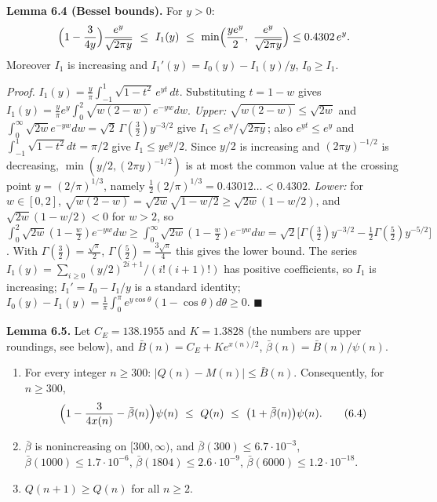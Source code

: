 \textbf{Lemma 6.4 (Bessel bounds).} For \(y>0\):
\[\Bigl(1-\frac3{4y}\Bigr)\frac{e^y}{\sqrt{2\pi y}}\ \le\ I_1(y)\ \le\ \min\Bigl(\frac{ye^y}2,\ \frac{e^y}{\sqrt{2\pi y}}\Bigr)\le0.4302\,e^y .\]
Moreover \(I_1\) is increasing and \(I_1'(y)=I_0(y)-I_1(y)/y\), \(I_0\ge I_1\).

\emph{Proof.} \(I_1(y)=\frac y\pi\int_{-1}^1\sqrt{1-t^2}\,e^{yt}\,dt\). Substituting \(t=1-w\) gives \(I_1(y)=\frac y\pi e^y\int_0^2\sqrt{w(2-w)}\,e^{-yw}dw\). \emph{Upper:} \(\sqrt{w(2-w)}\le\sqrt{2w}\) and \(\int_0^\infty\sqrt{2w}e^{-yw}dw=\sqrt2\,\Gamma(\frac32)y^{-3/2}\) give \(I_1\le e^y/\sqrt{2\pi y}\); also \(e^{yt}\le e^y\) and \(\int_{-1}^1\sqrt{1-t^2}dt=\pi/2\) give \(I_1\le ye^y/2\). Since \(y/2\) is increasing and \((2\pi y)^{-1/2}\) is decreasing, \(\min(y/2,(2\pi y)^{-1/2})\) is at most the common value at the crossing point \(y=(2/\pi)^{1/3}\), namely \(\frac12(2/\pi)^{1/3}=0.43012\ldots<0.4302\). \emph{Lower:} for \(w\in[0,2]\), \(\sqrt{w(2-w)}=\sqrt{2w}\sqrt{1-w/2}\ge\sqrt{2w}(1-w/2)\), and \(\sqrt{2w}(1-w/2)<0\) for \(w>2\), so \(\int_0^2\sqrt{2w}(1-\frac w2)e^{-yw}dw\ge\int_0^\infty\sqrt{2w}(1-\frac w2)e^{-yw}dw=\sqrt2\bigl[\Gamma(\tfrac32)y^{-3/2}-\tfrac12\Gamma(\tfrac52)y^{-5/2}\bigr]\). With \(\Gamma(\frac32)=\frac{\sqrt\pi}2\), \(\Gamma(\frac52)=\frac{3\sqrt\pi}4\) this gives the lower bound. The series \(I_1(y)=\sum_{i\ge0}(y/2)^{2i+1}/(i!(i+1)!)\) has positive coefficients, so \(I_1\) is increasing; \(I_1'=I_0-I_1/y\) is a standard identity; \(I_0(y)-I_1(y)=\frac1\pi\int_0^\pi e^{y\cos\theta}(1-\cos\theta)d\theta\ge0\). \(\blacksquare\)

\textbf{Lemma 6.5.} Let \(C_E=138.1955\) and \(K=1.3828\) (the numbers are upper roundings, see below), and \(\bar B(n)=C_E+Ke^{x(n)/2}\), \(\bar\beta(n)=\bar B(n)/\psi(n)\).

\begin{enumerate}
\def\labelenumi{\arabic{enumi}.}
\tightlist
\item
  For every integer \(n\ge300\): \(|Q(n)-M(n)|\le\bar B(n)\). Consequently, for \(n\ge300\),
  \[\Bigl(1-\frac{3}{4x(n)}-\bar\beta(n)\Bigr)\psi(n)\ \le\ Q(n)\ \le\ \bigl(1+\bar\beta(n)\bigr)\psi(n).\tag{6.4}\]
\item
  \(\bar\beta\) is nonincreasing on \([300,\infty)\), and \(\bar\beta(300)\le6.7\cdot10^{-3}\), \(\bar\beta(1000)\le1.7\cdot10^{-6}\), \(\bar\beta(1804)\le2.6\cdot10^{-9}\), \(\bar\beta(6000)\le1.2\cdot10^{-18}\).
\item
  \(Q(n+1)\ge Q(n)\) for all \(n\ge2\).
\end{enumerate}

